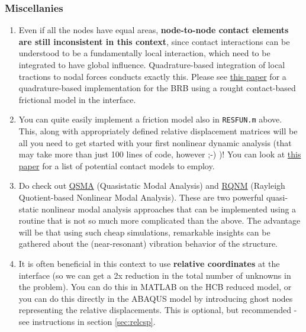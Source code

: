 \documentclass[11pt]{article}
\begin{document}
\subsubsection{Miscellanies}
\label{sec:org17084a2}
\begin{enumerate}
\item Even if all the nodes have equal areas, \textbf{node-to-node contact elements are still inconsistent in this context}, since contact interactions can be understood to be a fundamentally local interaction, which need to be integrated to have global influence.
Quadrature-based integration of local tractions to nodal forces conducts exactly this.
Please see \href{https://www.sciencedirect.com/science/article/abs/pii/S0888327020300017}{this paper} for a quadrature-based implementation for the BRB using a rought contact-based frictional model in the interface.
\item You can quite easily implement a friction model also in \texttt{RESFUN.m} above.
This, along with appropriately defined relative displacement matrices will be all you need to get started with your first nonlinear dynamic analysis (that may take more than just 100 lines of code, however ;-) )!
You can look at \href{https://asmedigitalcollection.asme.org/appliedmechanicsreviews/article/72/4/040802/1084997/A-Review-of-Damping-Models-for-Structures-With?casa\_token=JWwE4Nf3808AAAAA:266N8zS75p4KrKsaZLrVHrnMfOSyZoq3urnmMf1QbWvJbDrWQYw6FJcpYFmffulGetIYTnMAlA}{this paper} for a list of potential contact models to employ.
\item Do check out \href{https://www.sciencedirect.com/science/article/abs/pii/S0888327018305739}{QSMA} (Quasistatic Modal Analysis) and \href{https://www.sciencedirect.com/science/article/abs/pii/S0045794919315160}{RQNM} (Rayleigh Quotient-based Nonlinear Modal Analysis).
These are two powerful quasi-static nonlinear modal analysis approaches that can be implemented using a routine that is not so much more complicated than the above.
The advantage will be that using such cheap simulations, remarkable insights can be gathered about the (near-resonant) vibration behavior of the structure.
\item It is often beneficial in this context to use \textbf{relative coordinates} at the interface (so we can get a 2x reduction in the total number of unknowns in the problem). 
You can do this in MATLAB on the HCB reduced model, or you can do this directly in the ABAQUS model by introducing ghost nodes representing the relative displacements.
This is optional, but recommended - see instructions in section \ref{sec:relcsp}.
\end{enumerate}
\end{document}
